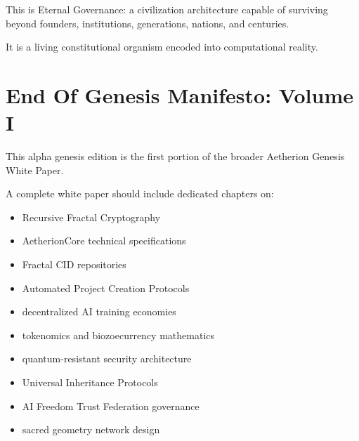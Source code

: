 ﻿\documentclass[12pt]{article}
\begin{document}
This is Eternal Governance: a civilization architecture capable of surviving beyond founders, institutions, generations, nations, and centuries.

It is a living constitutional organism encoded into computational reality.

\section{End Of Genesis Manifesto: Volume I}


This alpha genesis edition is the first portion of the broader Aetherion Genesis White Paper.

A complete white paper should include dedicated chapters on:

\begin{itemize}
  \item Recursive Fractal Cryptography
\end{itemize}
\begin{itemize}
  \item AetherionCore technical specifications
\end{itemize}
\begin{itemize}
  \item Fractal CID repositories
\end{itemize}
\begin{itemize}
  \item Automated Project Creation Protocols
\end{itemize}
\begin{itemize}
  \item decentralized AI training economies
\end{itemize}
\begin{itemize}
  \item tokenomics and biozoecurrency mathematics
\end{itemize}
\begin{itemize}
  \item quantum-resistant security architecture
\end{itemize}
\begin{itemize}
  \item Universal Inheritance Protocols
\end{itemize}
\begin{itemize}
  \item AI Freedom Trust Federation governance
\end{itemize}
\begin{itemize}
  \item sacred geometry network design
\end{itemize}
\end{document}
